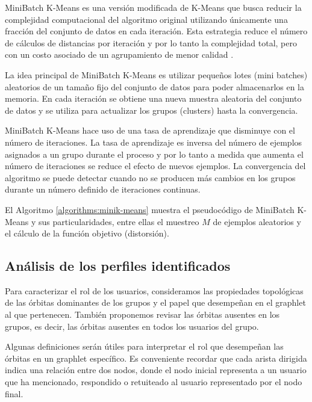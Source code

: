 MiniBatch K-Means \cite{sculley_web-scale_2010} es una versión modificada de K-Means que busca reducir la complejidad computacional del algoritmo original utilizando únicamente una fracción del conjunto de datos en cada iteración. Esta estrategia reduce el número de cálculos de distancias por iteración y por lo tanto la complejidad total, pero con un costo asociado de un agrupamiento de menor calidad \cite{bejar_k-means_nodate}.

La idea principal de MiniBatch K-Means es utilizar pequeños lotes (mini batches) aleatorios de un tamaño fijo del conjunto de datos para poder almacenarlos en la memoria. En cada iteración se obtiene una nueva muestra aleatoria del conjunto de datos y se utiliza para actualizar los grupos (clusters) hasta la convergencia. 

MiniBatch K-Means hace uso de una tasa de aprendizaje que disminuye con el número de iteraciones. La tasa de aprendizaje es inversa del número de ejemplos asignados a un grupo durante el proceso y por lo tanto a medida que aumenta el número de iteraciones se reduce el efecto de nuevos ejemplos. La convergencia del algoritmo se puede detectar cuando no se producen más cambios en los grupos durante un número definido de iteraciones continuas. 


El Algoritmo \ref{algorithms:minik-means} muestra el pseudocódigo de MiniBatch K-Means y sus particularidades, entre ellas el muestreo $M$ de ejemplos aleatorios y el cálculo de la función objetivo (distorsión).

 

\subsection{Análisis de los perfiles identificados}
Para caracterizar el rol de los usuarios, consideramos las propiedades topológicas de las órbitas dominantes de los grupos y el papel que desempeñan en el graphlet al que pertenecen. También proponemos revisar las órbitas ausentes en los grupos, es decir, las órbitas ausentes en todos los usuarios del grupo.

Algunas definiciones serán útiles para interpretar el rol que desempeñan las órbitas en un graphlet específico. Es conveniente recordar que cada arista dirigida indica una relación entre dos nodos, donde el nodo inicial representa a un usuario que ha mencionado, respondido o retuiteado al usuario representado por el nodo final. 

